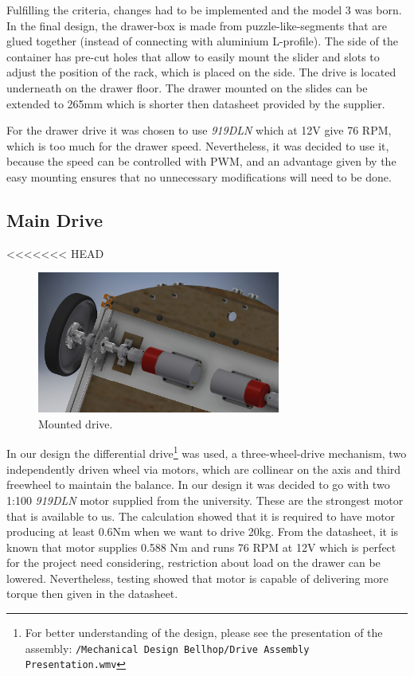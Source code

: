 \documentclass[11pt]{article}
\begin{document}
Fulfilling the criteria, changes had to be implemented and the model 3 was born. In the final design, the drawer-box is made from puzzle-like-segments that are glued together (instead of connecting with aluminium L-profile). The side of the container has pre-cut holes that allow to easily mount the slider and slots to adjust the position of the rack, which is placed on the side. The drive is located underneath on the drawer floor. The drawer mounted on the slides can be extended to 265mm which is shorter then datasheet provided by the supplier.


For the drawer drive it was chosen to use \textit{919DLN} which at 12V give 76 RPM, which is too much for the drawer speed. Nevertheless, it was decided to use it, because the speed can be controlled with PWM, and an advantage given by the easy mounting ensures that no unnecessary modifications will need to be done.


\subsection*{Main Drive}

<<<<<<< HEAD
\begin{figure}
  \includegraphics[width=8cm]{maindrive}
  \caption{Mounted drive.}
  \label{profile}
\end{figure}

In our design the differential drive\footnote{For better understanding of the design, please see the presentation of the assembly: \texttt{/Mechanical Design Bellhop/Drive Assembly Presentation.wmv}} was used, a three-wheel-drive mechanism, two independently driven wheel via motors, which are collinear on the axis and third freewheel to maintain the balance. In our design it was decided to go with two 1:100 \textit{919DLN} motor supplied from the university. These are the strongest motor that is available to us. The calculation showed that it is required to have motor producing at least 0.6Nm when we want to drive 20kg. From the datasheet, it is known that motor supplies 0.588 Nm and runs 76 RPM at 12V which is perfect for the project need considering, restriction about load on the drawer can be lowered. Nevertheless, testing showed that motor is capable of delivering more torque then given in the datasheet.
\end{document}
